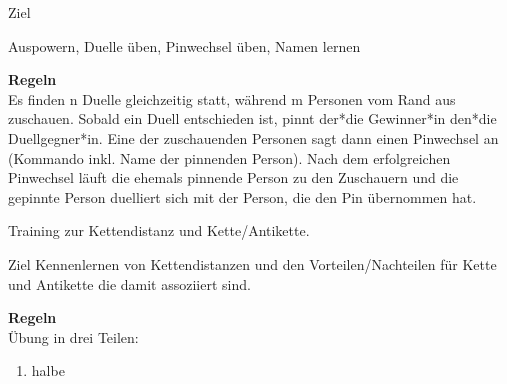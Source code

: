 \begin{bclogo}[logo=\bcoutil]{Ziel}

Auspowern, Duelle üben, Pinwechsel üben, Namen lernen

\end{bclogo}

\textbf{\large Regeln}\\

Es finden n Duelle gleichzeitig statt, während m Personen vom Rand aus zuschauen. Sobald ein Duell entschieden ist, pinnt der*die Gewinner*in den*die Duellgegner*in. Eine der zuschauenden Personen sagt dann einen Pinwechsel an (Kommando inkl. Name der pinnenden Person). Nach dem erfolgreichen Pinwechsel läuft die ehemals pinnende Person zu den Zuschauern und die gepinnte Person duelliert sich mit der Person, die den Pin übernommen hat.


Training zur Kettendistanz und Kette/Antikette. 


\begin{bclogo}[logo=\bcoutil]{Ziel}
Kennenlernen von Kettendistanzen und den Vorteilen/Nachteilen für Kette und Antikette die damit assoziiert sind. 
\end{bclogo}

\textbf{\large Regeln}\\
Übung in drei Teilen:

\begin{enumerate}
    \item halbe 
\end{enumerate}
